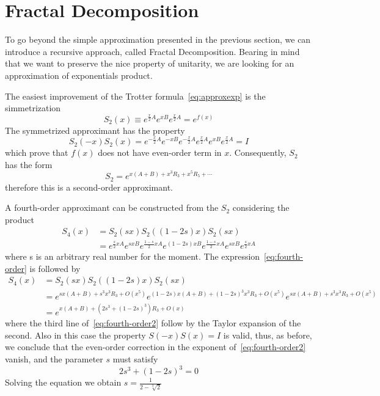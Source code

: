 \section{Fractal Decomposition}

To go beyond the simple approximation presented in the previous section, we can introduce a recursive approach, called Fractal Decomposition. Bearing in mind that we want to preserve the nice property of unitarity, we are looking for an approximation of exponentials product.

The easiest improvement of the Trotter formula~\ref{eq:approxexp} is the simmetrization
\begin{equation}
S_2(x) \equiv e^{\frac{x}{2}A} e^{xB} e^{\frac{x}{2}A} = e^{f(x)}
\end{equation}
The symmetrized approximant has the property
\begin{equation}
S_2(-x) S_2(x) = e^{-\frac{x}{2}A} e^{-xB} e^{-\frac{x}{2}A} e^{\frac{x}{2}A} e^{xB} e^{\frac{x}{2}A} = I
\end{equation}
which prove that $f(x)$ does not have even-order term in $x$. Consequently, $S_2$ has the form
\begin{equation}
S_2 = e^{x(A+B) + x^3R_3 + x^5R_5 + \cdots}
\end{equation}
therefore this is a second-order approximant.

A fourth-order approximant can be constructed from the $S_2$ considering the product
\begin{align} \label{eq:fourth-order}
S_4(x) &= S_2(sx) S_2((1-2s)x) S_2(sx) \\
&= e^{\frac{s}{2}xA} e^{sxB} e^{\frac{1-s}{2}xA} e^{(1-2s)xB} e^{\frac{1-s}{2}xA} e^{sxB} e^{\frac{s}{2}xA}
\end{align}
where s is an arbitrary real number for the moment. The expression~\eqref{eq:fourth-order} is followed by
\begin{align} \label{eq:fourth-order2}
S_4(x) &= S_2(sx) S_2((1-2s)x) S_2(sx) \\
&= e^{sx(A+B) + s^3x^3R_3 + O(x^5)} e^{(1-2s)x(A+B) + (1-2s)^3x^3R_3 + O(x^5)} e^{sx(A+B) + s^3x^3R_3 + O(x^5)} \\
&= e^{x(A+B)+(2s^3+(1-2s)^3)R_3+O(x)}
\end{align}
where the third line of~\eqref{eq:fourth-order2} follow by the Taylor expansion of the second. Also in this case the property $S(-x)S(x) = I$ is valid, thus, as before, we conclude that the even-order correction in the exponent of~\eqref{eq:fourth-order2} vanish, and the parameter $s$ must satisfy
\begin{equation}
2s^3 + (1-2s)^3 = 0
\end{equation}
Solving the equation we obtain $s = \frac{1}{2-\sqrt[3]{2}}$


